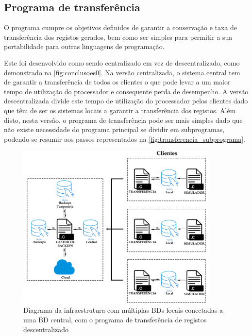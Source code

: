 \documentclass[11pt,twoside,a4paper]{report}
\begin{document}
\subsection{Programa de transferência}
O programa cumpre os objetivos definidos de garantir a conservação e taxa de transferência dos registos gerados, bem como ser simples para permitir a sua portabilidade para outras linguagens de programação.\par
Este foi desenvolvido como sendo centralizado em vez de descentralizado, como demonstrado na \autoref{fig:conclusoes0}. 
Na versão centralizada, o sistema central tem de garantir a transferência de todos os clientes o que pode levar a um maior tempo de utilização do processador e consequente perda de desempenho. A versão descentralizada divide este tempo de utilização do processador pelos clientes dado que têm de ser os sistemas locais a garantir a transferência dos registos. Além disto, nesta versão, o programa de transferência pode ser mais simples dado que não existe necessidade do programa principal se dividir em subprogramas, podendo-se resumir aos passos representados na \autoref{fig:transferencia_subprograma}.
\begin{figure}[H]
	\begin{center}
		\includegraphics[width=0.9\textwidth]{Esquema_Projeto_Descentralizado} %
		\caption[Diagrama da infraestrutura com o programa de transferência descentralizado]{Diagrama da infraestrutura com múltiplas BDs locais conectadas a uma BD central, com o programa de transferência de registos descentralizado}
		\label{fig:conclusoes0}
	\end{center}
\end{figure}
\end{document}

